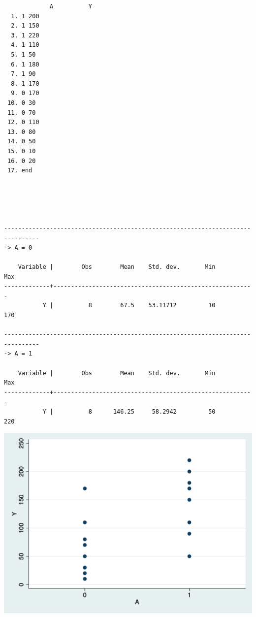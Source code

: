 \documentclass[
  10pt,
]{book}
\begin{document}
\begin{verbatim}
             A          Y
  1. 1 200
  2. 1 150
  3. 1 220
  4. 1 110
  5. 1 50
  6. 1 180
  7. 1 90
  8. 1 170
  9. 0 170
 10. 0 30
 11. 0 70
 12. 0 110
 13. 0 80
 14. 0 50
 15. 0 10
 16. 0 20
 17. end





--------------------------------------------------------------------------------
-> A = 0

    Variable |        Obs        Mean    Std. dev.       Min        Max
-------------+---------------------------------------------------------
           Y |          8        67.5    53.11712         10        170

--------------------------------------------------------------------------------
-> A = 1

    Variable |        Obs        Mean    Std. dev.       Min        Max
-------------+---------------------------------------------------------
           Y |          8      146.25     58.2942         50        220
\end{verbatim}

\begin{center}\includegraphics[width=0.85\linewidth]{figs/stata-fig-11-1} \end{center}
\end{document}
